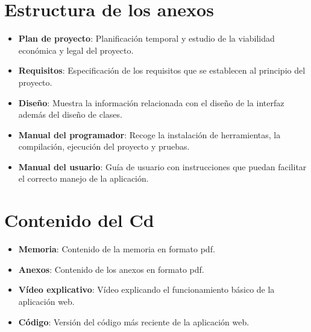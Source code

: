 \section{Estructura de los anexos}
\begin{itemize}
	\item \textbf{Plan de proyecto}: Planificación temporal y estudio de la viabilidad económica y legal del proyecto.
	\item \textbf{Requisitos}: Especificación de los requisitos que se establecen al principio del proyecto.
	\item \textbf{Diseño}: Muestra la información relacionada con el diseño de la interfaz además del diseño de clases.
	\item \textbf{Manual del programador}: Recoge la instalación de herramientas, la compilación, ejecución del proyecto y pruebas.
	\item \textbf{Manual del usuario}: Guía de usuario con instrucciones que puedan facilitar el correcto manejo de la aplicación.
\end{itemize}

\section{Contenido del Cd}
\begin{itemize}
	\item \textbf{Memoria}: Contenido de la memoria en formato pdf.
	\item \textbf{Anexos}: Contenido de los anexos en formato pdf.
	\item \textbf{Vídeo explicativo}: Vídeo explicando el funcionamiento básico de la aplicación web.
	\item \textbf{Código}: Versión del código más reciente de la aplicación web.  	
\end{itemize}